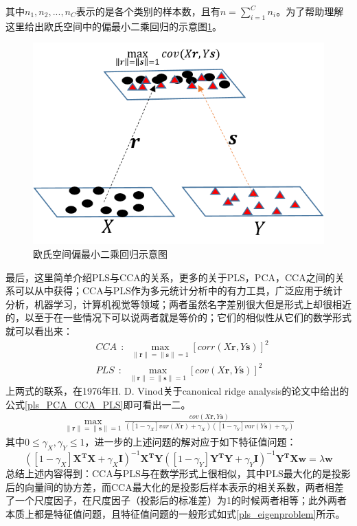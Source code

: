 其中$n_1,n_2,...,n_C$表示的是各个类别的样本数，且有$n=\sum_{i=1}^{C}n_i$。为了帮助理解这里给出欧氏空间中的偏最小二乘回归的示意图\ref{fig:PLS_Euclidean}。
\begin{figure}[h]
	\centering
	\includegraphics[width=0.5\linewidth]{source/PLS_Euclidean.png}
  	\caption{欧氏空间偏最小二乘回归示意图}
  	\label{fig:PLS_Euclidean}
\end{figure}

最后，这里简单介绍PLS与CCA的关系，更多的关于PLS，PCA，CCA之间的关系可以从\cite{pls_PLSALL}中获得；CCA与PLS作为多元统计分析中的有力工具，广泛应用于统计分析，机器学习，计算机视觉等领域；两者虽然名字差别很大但是形式上却很相近的，以至于在一些情况下可以说两者就是等价的；它们的相似性从它们的数学形式就可以看出来：
\begin{equation}
\label{pls_CCA_VS_PLS}
\begin{split}
&CCA~~:~~\max_{\|\bm{r}\|=\|\bm{s}\|=1}[corr(X\bm{r},Y\bm{s})]^2\\
&PLS~~:~~\max_{\|\bm{r}\|=\|\bm{s}\|=1}[cov(X\bm{r},Y\bm{s})]^2
\end{split}
\end{equation}
上两式的联系，在1976年H. D. Vinod关于canonical ridge analysis的论文\cite{pls_Canonical_ridge}中给出的公式\ref{pls_PCA_CCA_PLS}即可看出一二。
\begin{equation}
\label{pls_PCA_CCA_PLS}
\begin{split}
\max_{\|\bm{r}\|=\|\bm{s}\|=1}\frac{cov(X\bm{r},Y\bm{s})}{([1-\gamma_X]var(X\bm{r})+\gamma_X)([1-\gamma_Y]var(Y\bm{s})+\gamma_Y)}
\end{split}
\end{equation}
其中$0\leq \gamma_X,\gamma_Y \leq 1$，进一步的上述问题的解对应于如下特征值问题：
\begin{equation}
\label{pls_eigenproblem}
([1-\gamma_X]\bm{X^{T}X}+\gamma_X\bm{I})^{-1}\bm{X^{T}Y}([1-\gamma_Y]\bm{Y^{T}Y}+\gamma_Y\bm{I})^{-1}\bm{Y^{T}Xw}=\lambda\bm{w}
\end{equation}
总结上述内容得到：CCA与PLS与在数学形式上很相似，其中PLS最大化的是投影后的向量间的协方差，而CCA最大化的是投影后样本表示的相关系数，两者相差了一个尺度因子，在尺度因子（投影后的标准差）为1的时候两者相等；此外两者本质上都是特征值问题，且特征值问题的一般形式如式\ref{pls_eigenproblem}所示。

